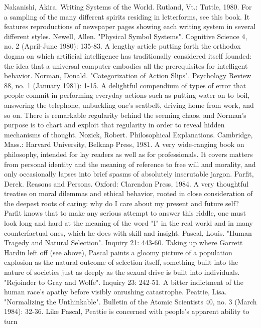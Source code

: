 Nakanishi, Akira. Writing Systems of the World. Rutland, Vt.: Tuttle, 1980. For a sampling
  of the many different spirits residing in letterforms, see this book. It features reproductions
  of newspaper pages showing each writing system in several different styles.
Newell, Allen. "Physical Symbol Systems". Cognitive Science 4, no. 2 (April-June 1980):
  135-83. A lengthy article putting forth the orthodox dogma on which artificial intelligence
  has traditionally considered itself founded: the idea that a universal computer embodies all
  the prerequisites for intelligent behavior.
Norman, Donald. "Categorization of Action Slips". Psychology Review 88, no. 1 (January
  1981): 1-15. A delightful compendium of types of error that people commit in performing
  everyday actions such as putting water on to boil, answering the telephone, unbuckling
  one's seatbelt, driving home from work, and so on. There is remarkable regularity behind
  the seeming chaos, and Norman's purpose is to chart and exploit that regularity in order to
  reveal hidden mechanisms of thought.
Nozick, Robert. Philosophical Explanations. Cambridge, Mass.: Harvard University, Belknap
  Press, 1981. A very wide-ranging book on philosophy, intended for lay readers as well as
  for professionals. It covers matters from personal identity and the meaning of reference to
  free will and morality, and only occasionally lapses into brief spasms of absolutely
  inscrutable jargon.
Parfit, Derek. Reasons and Persons. Oxford: Clarendon Press, 1984. A very thoughtful
  treatise on moral dilemmas and ethical behavior, rooted in close consideration of the
  deepest roots of caring: why do I care about my present and future self? Parfit knows that to
  make any serious attempt to answer this riddle, one must look long and hard at the meaning
  of the word "I" in the real world and in many counterfactual ones, which he does with skill
  and insight.
Pascal, Louis. "Human Tragedy and Natural Selection". Inquiry 21: 443-60. Taking up where
  Garrett Hardin left off (see above), Pascal paints a gloomy picture of a population explosion
  as the natural outcome of selection itself, something built into the nature of societies just as
  deeply as the sexual drive is built into individuals.
"Rejoinder to Gray and Wolfe". Inquiry 23: 242-51. A bitter indictment of the human race's
  apathy before visibly onrushing catastrophe.
Peattie, Lisa. "Normalizing the Unthinkable". Bulletin of the Atomic Scientists 40, no. 3
  (March 1984): 32-36. Like Pascal, Peattie is concerned with people's apparent ability to turn
